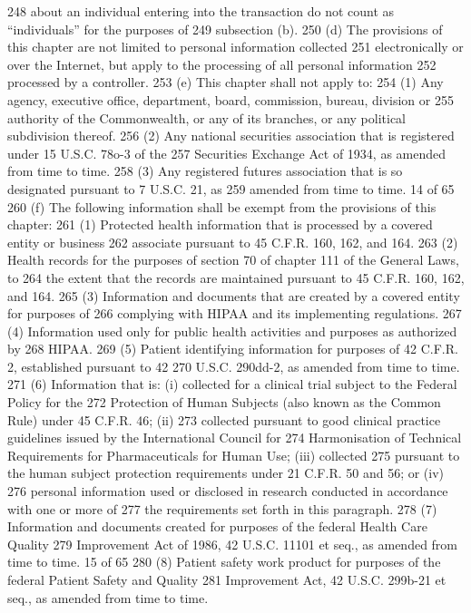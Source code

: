 248 about an individual entering into the transaction do not count as “individuals” for the purposes of
249 subsection (b).
250 (d) The provisions of this chapter are not limited to personal information collected
251 electronically or over the Internet, but apply to the processing of all personal information
252 processed by a controller.
253 (e) This chapter shall not apply to:
254 (1) Any agency, executive office, department, board, commission, bureau, division or
255 authority of the Commonwealth, or any of its branches, or any political subdivision thereof.
256 (2) Any national securities association that is registered under 15 U.S.C. 78o-3 of the
257 Securities Exchange Act of 1934, as amended from time to time.
258 (3) Any registered futures association that is so designated pursuant to 7 U.S.C. 21, as
259 amended from time to time.
14 of 65
260 (f) The following information shall be exempt from the provisions of this chapter:
261 (1) Protected health information that is processed by a covered entity or business
262 associate pursuant to 45 C.F.R. 160, 162, and 164.
263 (2) Health records for the purposes of section 70 of chapter 111 of the General Laws, to
264 the extent that the records are maintained pursuant to 45 C.F.R. 160, 162, and 164.
265 (3) Information and documents that are created by a covered entity for purposes of
266 complying with HIPAA and its implementing regulations.
267 (4) Information used only for public health activities and purposes as authorized by
268 HIPAA.
269 (5) Patient identifying information for purposes of 42 C.F.R. 2, established pursuant to 42
270 U.S.C. 290dd-2, as amended from time to time.
271 (6) Information that is: (i) collected for a clinical trial subject to the Federal Policy for the
272 Protection of Human Subjects (also known as the Common Rule) under 45 C.F.R. 46; (ii)
273 collected pursuant to good clinical practice guidelines issued by the International Council for
274 Harmonisation of Technical Requirements for Pharmaceuticals for Human Use; (iii) collected
275 pursuant to the human subject protection requirements under 21 C.F.R. 50 and 56; or (iv)
276 personal information used or disclosed in research conducted in accordance with one or more of
277 the requirements set forth in this paragraph.
278 (7) Information and documents created for purposes of the federal Health Care Quality
279 Improvement Act of 1986, 42 U.S.C. 11101 et seq., as amended from time to time.
15 of 65
280 (8) Patient safety work product for purposes of the federal Patient Safety and Quality
281 Improvement Act, 42 U.S.C. 299b-21 et seq., as amended from time to time.

